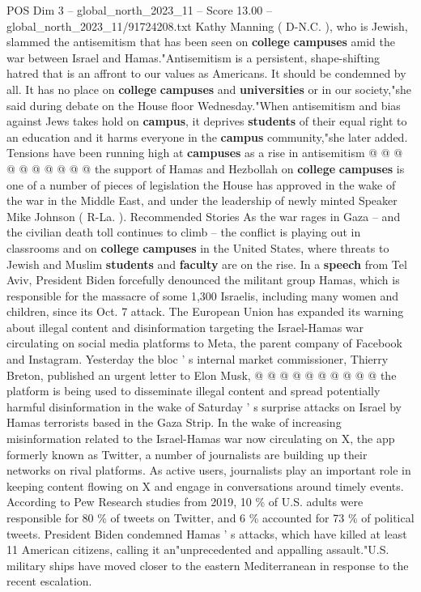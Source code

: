 \begin{textsample}{POS Dim 3 – global\_north\_2023\_11 – Score 13.00 – global\_north\_2023\_11/91724208.txt}
Kathy Manning ( D-N.C. ), who is Jewish, slammed the antisemitism that has been seen on \textbf{college} \textbf{campuses} amid the war between Israel and Hamas."Antisemitism is a persistent, shape-shifting hatred that is an affront to our values as Americans.
It should be condemned by all.
It has no place on \textbf{college} \textbf{campuses} and \textbf{universities} or in our society,"she said during debate on the House floor Wednesday."When antisemitism and bias against Jews takes hold on \textbf{campus}, it deprives \textbf{students} of their equal right to an education and it harms everyone in the \textbf{campus} community,"she later added.
Tensions have been running high at \textbf{campuses} as a rise in antisemitism @ @ @ @ @ @ @ @ @ @ the support of Hamas and Hezbollah on \textbf{college} \textbf{campuses} is one of a number of pieces of legislation the House has approved in the wake of the war in the Middle East, and under the leadership of newly minted Speaker Mike Johnson ( R-La. ).
Recommended Stories As the war rages in Gaza -- and the civilian death toll continues to climb -- the conflict is playing out in classrooms and on \textbf{college} \textbf{campuses} in the United States, where threats to Jewish and Muslim \textbf{students} and \textbf{faculty} are on the rise.
In a \textbf{speech} from Tel Aviv, President Biden forcefully denounced the militant group Hamas, which is responsible for the massacre of some 1,300 Israelis, including many women and children, since its Oct. 7 attack.
The European Union has expanded its warning about illegal content and disinformation targeting the Israel-Hamas war circulating on social media platforms to Meta, the parent company of Facebook and Instagram.
Yesterday the bloc ' s internal market commissioner, Thierry Breton, published an urgent letter to Elon Musk, @ @ @ @ @ @ @ @ @ @ the platform is being used to disseminate illegal content and spread potentially harmful disinformation in the wake of Saturday ' s surprise attacks on Israel by Hamas terrorists based in the Gaza Strip.
In the wake of increasing misinformation related to the Israel-Hamas war now circulating on X, the app formerly known as Twitter, a number of journalists are building up their networks on rival platforms.
As active users, journalists play an important role in keeping content flowing on X and engage in conversations around timely events.
According to Pew Research studies from 2019, 10 \% of U.S. adults were responsible for 80 \% of tweets on Twitter, and 6 \% accounted for 73 \% of political tweets.
President Biden condemned Hamas ' s attacks, which have killed at least 11 American citizens, calling it an"unprecedented and appalling assault."U.S. military ships have moved closer to the eastern Mediterranean in response to the recent escalation.

\end{textsample}
